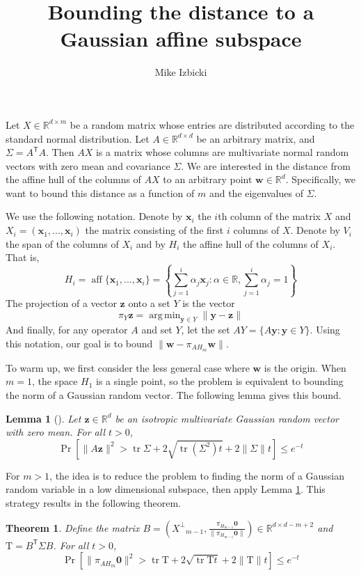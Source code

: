 \documentclass{article}
\title{Bounding the distance to a Gaussian affine subspace}
\author{Mike Izbicki}
\newtheorem{theorem}{Theorem}
\newtheorem{lemma}{Lemma}
\theoremstyle{definition}
\DeclareMathOperator*{\affspan}{aff}
\DeclareMathOperator*{\argmin}{arg\,min}
\DeclareMathOperator*{\tr}{tr}
\DeclareMathOperator*{\probop}{Pr}
\newcommand{\prob}[1]{\ensuremath{\probop\left[{#1}\right]}}
\newcommand{\proj}[1]{\ensuremath{\pi}_{#1}}
\newcommand{\ltwo}[1]{\lVert{#1}\rVert}
\newcommand{\trans}[1]{\ensuremath{{#1}^{\mathsf{T}}}}
\newcommand{\comp}[1]{\ensuremath{{#1}^\bot}}
\newcommand{\zero}{\mathbf{0}}
\newcommand{\w}{\mathbf{w}}
\newcommand{\x}{\mathbf{x}}
\newcommand{\y}{\mathbf{y}}
\newcommand{\z}{\mathbf{z}}
\newcommand{\Tau}{\mathrm{T}}
\begin{document}
\maketitle

Let $X \in \mathbb{R}^{d\times m}$ be a random matrix whose entries are distributed according to the standard normal distribution.
Let $A \in \mathbb{R}^{d\times d}$ be an arbitrary matrix,
and $\Sigma=\trans A A$.
Then $A X$ is a matrix whose columns are multivariate normal random vectors with zero mean and covariance $\Sigma$.
We are interested in the distance from the affine hull of the columns of $AX$ to an arbitrary point $\w \in \mathbb{R}^d$.
Specifically, we want to bound this distance as a function of $m$ and the eigenvalues of $\Sigma$.

We use the following notation.
Denote by $\x_i$ the $i$th column of the matrix $X$ and $X_i=(\x_1,...,\x_i)$ the matrix consisting of the first $i$ columns of $X$.
Denote by $V_i$ the span of the columns of $X_i$ and by $H_i$ the affine hull of the columns of $X_i$.
That is,
\begin{equation}
H_i = \affspan\{\x_1,...,\x_i\}=\left\{\sum_{j=1}^i \alpha_j\x_j : \alpha\in\mathbb{R},\sum_{j=1}^i\alpha_j = 1 \right\}
\end{equation}
The projection of a vector $\z$ onto a set $Y$ is the vector
\begin{equation}
\proj{Y}\z = \argmin_{\y\in Y} \ltwo{\y-\z}
\end{equation}
And finally, for any operator $A$ and set $Y$, let the set $AY = \{A\y : \y \in Y\}$.
Using this notation, our goal is to bound
$
\ltwo{\w-\proj{AH_m}\w}
$.

To warm up, we first consider the less general case where $\w$ is the origin.
When $m=1$,
the space $H_1$ is a single point,
so the problem is equivalent to bounding the norm of a Gaussian random vector.
The following lemma gives this bound.
\begin{lemma}[\cite{hsu2012tail}]
\label{lemma:hsu}
Let $\z\in\mathbb{R}^d$ be an isotropic multivariate Gaussian random vector with zero mean.
For all $t>0$,
\begin{equation}
\prob{\ltwo{A\z}^2 > \tr{\Sigma} + 2\sqrt{\tr (\Sigma^2)t} + 2\ltwo{\Sigma}t} \le e^{-t}
\end{equation}
\end{lemma}
\noindent
For $m>1$, the idea is to reduce the problem to finding the norm of a Gaussian random variable in a low dimensional subspace,
then apply Lemma \ref{lemma:hsu}.
This strategy results in the following theorem.
\begin{theorem}
\label{thm:center}
Define the matrix
$
B=
\left(
\comp X_{m-1}
,
\frac{\proj {H_{m-1}} \zero}{\ltwo {\proj {H_{m-1}} \zero}}
\right)
\in \mathbb{R}^{d\times d-m+2}
$
and
$\Tau=\trans B \Sigma B$.
For all $t>0$,
\begin{equation}
\label{eq:thm1a}
\prob{\ltwo{\proj{AH_m}\zero}^2
>
\tr \Tau + 2\sqrt{\tr \Tau t} + 2\ltwo{\Tau}t} \le e^{-t}
\end{equation}
\end{theorem}
\end{document}

